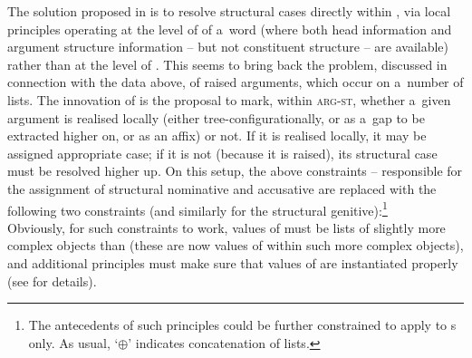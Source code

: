 \documentclass[output=paper
	        ,collection
	        ,collectionchapter
 	        ,biblatex
                ,babelshorthands
                ,newtxmath
                ,draftmode
                ,colorlinks, citecolor=brown
]{./langsci/langscibook}
\begin{document}
The solution proposed in \citet{prze:96,Prze99b,Prze99} is to resolve structural cases directly within , via local principles operating at the level of  of a~word (where both head information and argument structure information – but not constituent structure – are available) rather than at the level of .  This seems to bring back the problem, discussed in connection with the  data above, of raised arguments, which occur on a~number of  lists.  The innovation of \citet{prze:96,Prze99b,Prze99} is the proposal to mark, within \textsc{arg-st}, whether a~given argument is realised locally (either tree-con\-fi\-gu\-ra\-tio\-nal\-ly, or as a~gap to be extracted higher on, or as an affix) or not.  If it is realised locally, it may be assigned appropriate case; if it is not (because it is raised), its structural case must be resolved higher up.  On this setup, the above constraints – responsible for the assignment of structural nominative and accusative are replaced with the following two constraints (and similarly for the structural genitive):\footnote{The antecedents of such principles could be further constrained to apply to s only. As usual, `$\oplus$' indicates concatenation of lists.}
\ea
\label{nonc:cp:germ1}
  \impl 
\z
\ea \label{nonc:cp:germ2}
  \impl\\ 
\z
Obviously, for such constraints to work, values of  must be lists of slightly more complex objects than  (these are now values of  within such more complex objects), and additional principles must make sure that values of  are instantiated properly (see \citealt[78–79]{Prze99b} for details).
\end{document}
